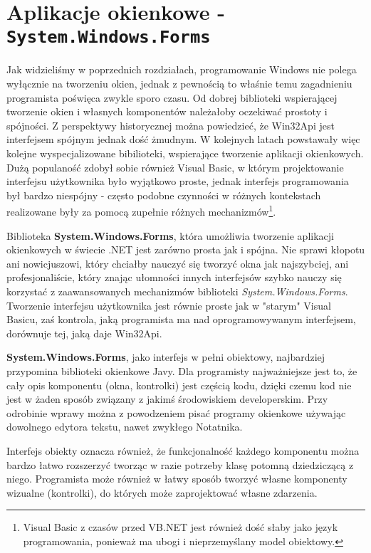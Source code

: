 ﻿\section{Aplikacje okienkowe - {\tt System.Windows.Forms}}

Jak widzieliśmy w poprzednich rozdziałach, programowanie Windows nie polega wyłącznie na tworzeniu okien,
jednak z pewnością to właśnie temu zagadnieniu programista poświęca zwykle sporo czasu. 
Od dobrej biblioteki wspierającej tworzenie okien i własnych komponentów należałoby oczekiwać prostoty
i spójności. Z perspektywy historycznej można powiedzieć, że Win32Api jest interfejsem spójnym jednak dość
żmudnym. W kolejnych latach powstawały więc kolejne wyspecjalizowane bibilioteki, 
wspierające tworzenie aplikacji okienkowych. Dużą populaność zdobył sobie również Visual Basic, 
w którym projektowanie interfejsu użytkownika było wyjątkowo proste, jednak interfejs programowania
był bardzo niespójny - często podobne czynności w różnych kontekstach realizowane były za pomocą
zupełnie różnych mechanizmów\footnote{Visual Basic z czasów przed VB.NET jest również dość słaby jako
język programowania, ponieważ ma ubogi i nieprzemyślany model obiektowy.}. 

Biblioteka {\bf System.Windows.Forms}, która umożliwia tworzenie aplikacji okienkowych w świecie .NET
jest zarówno prosta jak i spójna. Nie sprawi kłopotu ani nowicjuszowi, który chciałby nauczyć się 
tworzyć okna jak najszybciej, ani profesjonaliście, który znając ułomności innych interfejsów szybko
nauczy się korzystać z zaawansowanych mechanizmów biblioteki {\em System.Windows.Forms}. Tworzenie
interfejsu użytkownika jest równie proste jak w "starym" Visual Basicu, zaś kontrola, jaką programista
ma nad oprogramowywanym interfejsem, dorównuje tej, jaką daje Win32Api.

{\bf System.Windows.Forms}, jako interfejs w pełni obiektowy, najbardziej przypomina biblioteki
okienkowe Javy. Dla programisty najważniejsze jest to, że cały opis komponentu (okna, kontrolki) jest
częścią kodu, dzięki czemu kod nie jest w żaden sposób związany z jakimś środowiskiem developerskim.
Przy odrobinie wprawy można z powodzeniem pisać programy okienkowe używając dowolnego edytora tekstu,
nawet zwykłego Notatnika.

Interfejs obiekty oznacza również, że funkcjonalność każdego komponentu można bardzo łatwo rozszerzyć
tworząc w razie potrzeby klasę potomną dziedziczącą z niego. Programista może również w łatwy sposób
tworzyć własne komponenty wizualne (kontrolki), do których może zaprojektować własne zdarzenia. 






